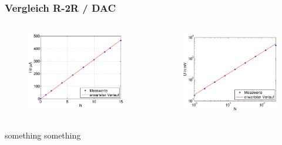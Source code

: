 \begin{frame}
    \frametitle{Vergleich R-2R / DAC}
    \framesubtitle{}
    \begin{columns}[c]
            \begin{figure}[H]
            \begin{center}
                    \includegraphics[scale=0.3]{./img/graph/Aufgabe1a.eps}
            \end{center}
            \end{figure}
            \begin{figure}[H]
            \begin{center}
                    \includegraphics[scale=0.3]{./img/graph/Aufgabe1b.eps}
            \end{center}
            \end{figure}
    \end{columns}
    \begin{block}{}
        something something
    \end{block}
\end{frame}
